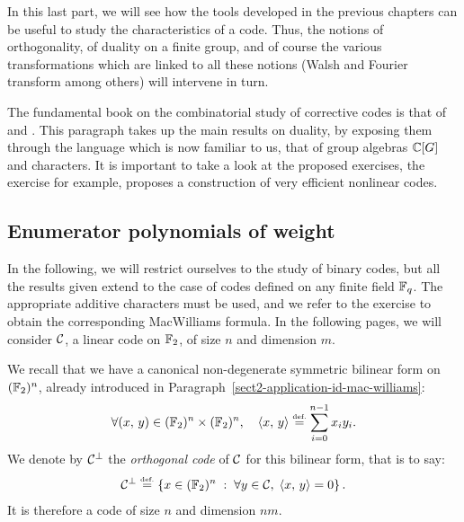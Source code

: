  
In this last part, we will see how the tools developed in the previous chapters can be useful to study the characteristics of a code. Thus, the notions of orthogonality, of duality on a finite group, and of course the various transformations which are linked to all these notions (Walsh and Fourier transform among others) will intervene in turn.
 
 
The fundamental book on the combinatorial study of corrective codes is that of  and  \cite{macwilliams-codes-correcteurs-1}. This paragraph takes up the main results on duality, by exposing them through the language which is now familiar to us, that of group algebras $ \mathbb{C} [G] $ and characters. It is important to take a look at the proposed exercises, the exercise  for example, proposes a construction of very efficient nonlinear codes.

\subsection{Enumerator polynomials of weight}
\label{sect2-polynomials-enumerators-weight}
 
In the following, we will restrict ourselves to the study of binary codes, but all the results given extend to the case of codes defined on any finite field $ \mathbb{F}_q $. The appropriate additive characters must be used, and we refer to the exercise  to obtain the corresponding MacWilliams formula. In the following pages, we will consider $ \mathcal{C} $, a linear code on $ \mathbb{F}_2 $, of size $ n $ and dimension $ m $.
 
\begin{defn}
\label{defn-code-dual}
  \label{notation-69} We recall that we have a canonical non-degenerate symmetric bilinear form on $ (\mathbb{F}_2)^n $, already introduced in Paragraph~\ref{sect2-application-id-mac-williams}:
\begin{equation}
\label{eq-fbs-canonical-f2}
\forall (x, \, y) \in (\mathbb{F}_2)^n \times (\mathbb{F}_2)^n, \quad \langle x,\,y\rangle \stackrel{\mbox{\upshape\tiny def.}}{=} \sum_{i = 0}^{n-1 }{x_i y_i}.
\end{equation}
We denote by $ \mathcal{C}^\bot $ the \textit{orthogonal code} of $ \mathcal{C} $ for this bilinear form, that is to say:
\begin{equation*}
\mathcal{C}^\bot \stackrel{\mbox{\upshape\tiny def.}}{=} \left\{ x \in (\mathbb{F}_2)^n \;:\; \forall y \in \mathcal{C}, \; \langle x,\,y\rangle = 0 \right\}.
\end{equation*}
It is therefore a code of size $ n $ and dimension $ nm $.
\end{defn}
 
